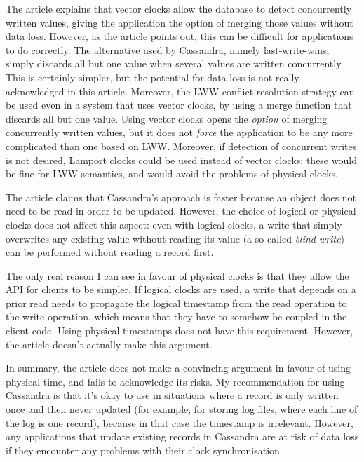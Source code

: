 {    The article explains that vector clocks allow the database to detect concurrently written values, giving the application the option of merging those values without data loss.
    However, as the article points out, this can be difficult for applications to do correctly.
    The alternative used by Cassandra, namely last-write-wins, simply discards all but one value when several values are written concurrently.
    This is certainly simpler, but the potential for data loss is not really acknowledged in this article.
    Moreover, the LWW conflict resolution strategy can be used even in a system that uses vector clocks, by using a merge function that discards all but one value.
    Using vector clocks opens the \emph{option} of merging concurrently written values, but it does not \emph{force} the application to be any more complicated than one based on LWW.
    Moreover, if detection of concurrent writes is not desired, Lamport clocks could be used instead of vector clocks: these would be fine for LWW semantics, and would avoid the problems of physical clocks.

    The article claims that Cassandra's approach is faster because an object does not need to be read in order to be updated.
    However, the choice of logical or physical clocks does not affect this aspect: even with logical clocks, a write that simply overwrites any existing value without reading its value (a so-called \emph{blind write}) can be performed without reading a record first.

    The only real reason I can see in favour of physical clocks is that they allow the API for clients to be simpler.
    If logical clocks are used, a write that depends on a prior read needs to propagate the logical timestamp from the read operation to the write operation, which means that they have to somehow be coupled in the client code.
    Using physical timestamps does not have this requirement.
    However, the article doesn't actually make this argument.

    In summary, the article does not make a convincing argument in favour of using physical time, and fails to acknowledge its risks.
    My recommendation for using Cassandra is that it's okay to use in situations where a record is only written once and then never updated (for example, for storing log files, where each line of the log is one record), because in that case the timestamp is irrelevant.
    However, any applications that update existing records in Cassandra are at risk of data loss if they encounter any problems with their clock synchronisation.
}

